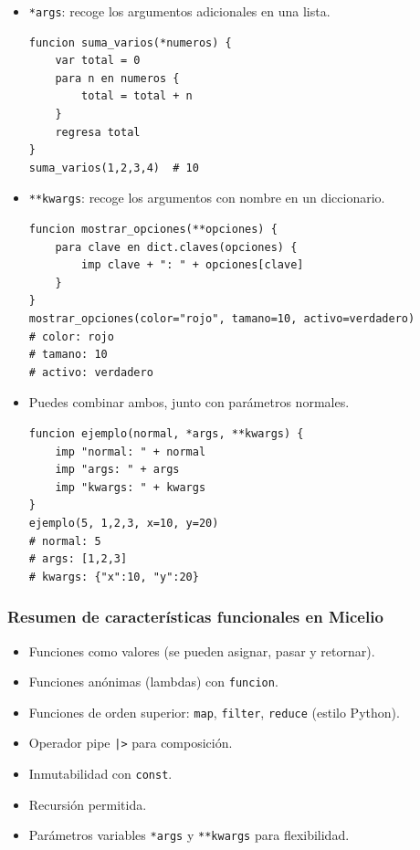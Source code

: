 \documentclass[12pt]{article}
\begin{document}
\begin{itemize}
    \item \texttt{*args}: recoge los argumentos adicionales en una lista.
\begin{lstlisting}
funcion suma_varios(*numeros) {
    var total = 0
    para n en numeros {
        total = total + n
    }
    regresa total
}
suma_varios(1,2,3,4)  # 10
\end{lstlisting}

    \item \texttt{**kwargs}: recoge los argumentos con nombre en un diccionario.
\begin{lstlisting}
funcion mostrar_opciones(**opciones) {
    para clave en dict.claves(opciones) {
        imp clave + ": " + opciones[clave]
    }
}
mostrar_opciones(color="rojo", tamano=10, activo=verdadero)
# color: rojo
# tamano: 10
# activo: verdadero
\end{lstlisting}

    \item Puedes combinar ambos, junto con parámetros normales.
\begin{lstlisting}
funcion ejemplo(normal, *args, **kwargs) {
    imp "normal: " + normal
    imp "args: " + args
    imp "kwargs: " + kwargs
}
ejemplo(5, 1,2,3, x=10, y=20)
# normal: 5
# args: [1,2,3]
# kwargs: {"x":10, "y":20}
\end{lstlisting}
\end{itemize}

\subsubsection*{Resumen de características funcionales en Micelio}

\begin{itemize}
    \item Funciones como valores (se pueden asignar, pasar y retornar).
    \item Funciones anónimas (lambdas) con \texttt{funcion}.
    \item Funciones de orden superior: \texttt{map}, \texttt{filter}, \texttt{reduce} (estilo Python).
    \item Operador pipe \texttt{|>} para composición.
    \item Inmutabilidad con \texttt{const}.
    \item Recursión permitida.
    \item Parámetros variables \texttt{*args} y \texttt{**kwargs} para flexibilidad.
\end{itemize}
\end{document}
